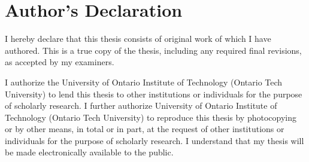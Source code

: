 \chapter*{Author's Declaration}

I hereby declare that this thesis consists of original work of which I have authored. This is a true copy of the thesis, including any required final revisions, as accepted by my examiners.

I authorize the University of Ontario Institute of Technology (Ontario Tech University) to lend this thesis to other institutions or individuals for the purpose of scholarly research. I further authorize University of Ontario Institute of Technology (Ontario Tech University) to reproduce this thesis by photocopying or by other means, in total or in part, at the request of other institutions or individuals for the purpose of scholarly research. I understand that my thesis will be made electronically available to the public.

\bigskip
\bigskip

\makeatletter\textbf{\@firstname\ {\@lastname}}\makeatother